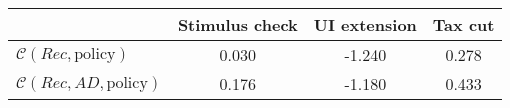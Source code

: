\begin{tabular}{@{}lccc@{}} 
\toprule 
                          & Stimulus check      & UI extension    & Tax cut    \\  \midrule 
$\mathcal{C}(Rec,\text{policy})$ & 0.030  & -1.240  & 0.278     \\ 
$\mathcal{C}(Rec, AD,\text{policy})$ & 0.176  & -1.180  & 0.433     \\ 
\end{tabular}  
